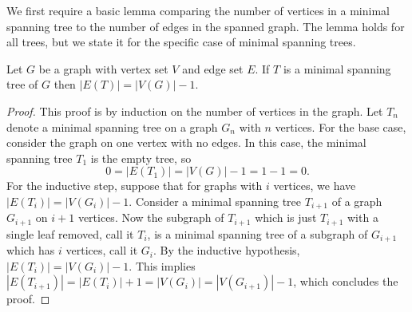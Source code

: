 \documentclass{article}
\begin{document}


%

We first require a basic lemma comparing the number of vertices in a minimal spanning tree to the number of edges in the spanned graph.
The lemma holds for all trees, but we state it for the specific case of minimal spanning trees.
\begin{lemma}\label{lem:tree}
  Let $G$ be a graph with vertex set $V$ and edge set $E$.
  If $T$ is a minimal spanning tree of $G$ then $|E(T)| = |V(G)| - 1$.
\end{lemma}
\begin{proof}
  This proof is by induction on the number of vertices in the graph.
  Let $T_n$ denote a minimal spanning tree on a graph $G_n$ with $n$ vertices.
  For the base case, consider the graph on one vertex with no edges.
  In this case, the minimal spanning tree $T_1$ is the empty tree, so
  \begin{equation*}
    0 = |E(T_1)| = |V(G)| - 1 = 1 - 1 = 0.
  \end{equation*}
  For the inductive step, suppose that for graphs with $i$ vertices, we have $|E(T_i)| = |V(G_i)| - 1$.
  Consider a minimal spanning tree $T_{i + 1}$ of a graph $G_{i + 1}$ on $i + 1$ vertices.
  Now the subgraph of $T_{i + 1}$ which is just $T_{i + 1}$ with a single leaf removed, call it $T_i$, is a minimal spanning tree of a subgraph of $G_{i + 1}$ which has $i$ vertices, call it $G_i$.
  By the inductive hypothesis, $|E(T_i)| = |V(G_i)| - 1$.
  This implies $|E(T_{i + 1})| = |E(T_i)| + 1 = |V(G_i)| = |V(G_{i + 1})| - 1$, which concludes the proof.
\end{proof}
\end{document}
